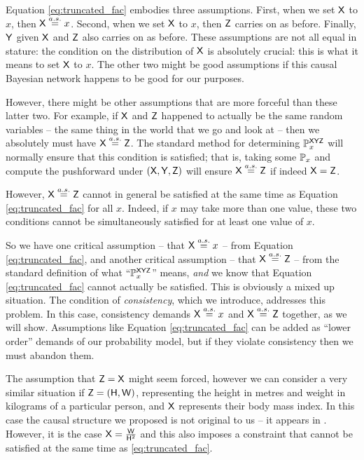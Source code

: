 Equation \ref{eq:truncated_fac} embodies three assumptions. First, when we set $\mathsf{X}$ to $x$, then $\mathsf{X}\overset{a.s.}{=}x$. Second, when we set $\mathsf{X}$ to $x$, then $\mathsf{Z}$ carries on as before. Finally, $\mathsf{Y}$ given $\mathsf{X}$ and $\mathsf{Z}$ also carries on as before. These assumptions are not all equal in stature: the condition on the distribution of $\mathsf{X}$ is absolutely crucial: this is what it means to set $\mathsf{X}$ to $x$. The other two might be good assumptions if this causal Bayesian network happens to be good for our purposes.

However, there might be other assumptions that are more forceful than these latter two. For example, if $\mathsf{X}$ and $\mathsf{Z}$ happened to actually be the same random variables -- the same thing in the world that we go and look at -- then we absolutely must have $\mathsf{X}\overset{a.s.}{=}\mathsf{Z}$. The standard method for determining $\mathbb{P}^{\mathsf{XYZ}}_x$ will normally ensure that this condition is satisfied; that is, taking some $\mathbb{P}_x$ and compute the pushforward under $(\mathsf{X},\mathsf{Y},\mathsf{Z})$ will ensure $\mathsf{X}\overset{a.s.}{=}\mathsf{Z}$ if indeed $\mathsf{X}=\mathsf{Z}$.

However, $\mathsf{X}\overset{a.s.}{=}\mathsf{Z}$ cannot in general be satisfied at the same time as Equation \ref{eq:truncated_fac} for all $x$. Indeed, if $x$ may take more than one value, these two conditions cannot be simultaneously satisfied for at least one value of $x$.

So we have one critical assumption -- that $\mathsf{X}\overset{a.s.}{=}x$ -- from Equation \ref{eq:truncated_fac}, and another critical assumption -- that $\mathsf{X}\overset{a.s.}{=}\mathsf{Z}$ -- from the standard definition of what ``$\mathbb{P}^{\mathsf{XYZ}}_{x}$'' means, \emph{and} we know that Equation \ref{eq:truncated_fac} cannot actually be satisfied. This is obviously a mixed up situation. The condition of \emph{consistency}, which we introduce, addresses this problem. In this case, consistency demands $\mathsf{X}\overset{a.s.}{=}x$ and $\mathsf{X}\overset{a.s.}{=}\mathsf{Z}$ together, as we will show. Assumptions like Equation \ref{eq:truncated_fac} can be added as ``lower order'' demands of our probability model, but if they violate consistency then we must abandon them.

The assumption that $\mathsf{Z}=\mathsf{X}$ might seem forced, however we can consider a very similar situation if $\mathsf{Z}=(\mathsf{H},\mathsf{W})$, representing the height in metres and weight in kilograms of a particular person, and $\mathsf{X}$ represents their body mass index. In this case the causal structure we proposed is not original to us -- it appears in \citet{shahar_association_2009}. However, it is the case $\mathsf{X}=\frac{\mathsf{W}}{\mathsf{H}^2}$ and this also imposes a constraint that cannot be satisfied at the same time as \ref{eq:truncated_fac}.

